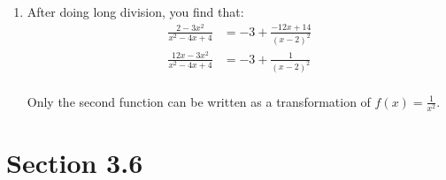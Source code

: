 \documentclass{exam}
\begin{document}
\begin{description}
\begin{enumerate}[a]
        \item
          After doing long division, you find that:
          \begin{align*}
            \frac{2 - 3x^2}{x^2 - 4x + 4} &= -3 + \frac{-12x + 14}{(x - 2)^2} \\
            \frac{12x - 3x^2}{x^2 - 4x + 4} &= -3 + \frac{1}{(x - 2)^2} \\
          \end{align*}

          Only the second function can be written as a transformation of $f(x) = \frac{1}{x^2}$.  
      \end{enumerate}

  \end{description}

  \pagebreak

  \section{Section 3.6}
\end{document}
